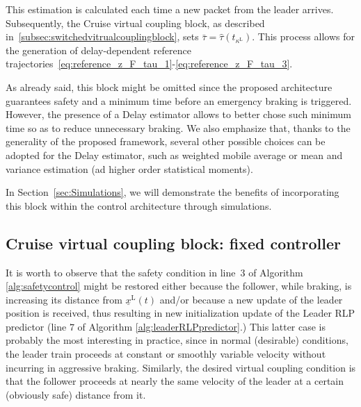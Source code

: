 \documentclass[letterpaper, 10 pt, conference]{ieeeconf}
\theoremstyle{definition}
\theoremstyle{nopoint}
\newcommand{\tildeAdd}{~}
\begin{document}
This estimation is calculated each time a new packet from the leader arrives. Subsequently, the Cruise virtual coupling block, as described in\tildeAdd\ref{subsec:switchedvitrualcouplingblock}, sets $\bar{\tau}=\hat{\tau}(t_{\kappa^\mathrm{L}})$. This process allows for the generation of delay-dependent reference trajectories\tildeAdd\eqref{eq:reference_z_F_tau_1}-\eqref{eq:reference_z_F_tau_3}.

As already said, this block might be omitted since the proposed architecture guarantees safety and a minimum time before an emergency braking is triggered. However, the presence of a Delay estimator allows to better chose such minimum time so as to reduce unnecessary braking. 
We also emphasize that, thanks to the generality of the proposed framework, several other possible choices can be adopted for the Delay estimator, such as weighted mobile average or mean and variance estimation (ad higher order statistical moments). 

In Section\tildeAdd\ref{sec:Simulations}, we will demonstrate the benefits of incorporating this block within the control architecture through simulations.



 
\subsection{Cruise virtual coupling block: fixed controller}
 \label{subsec:vitrualcouplingblock} 
 
It is worth to observe that the safety condition in line\tildeAdd$3$ of  Algorithm \ref{alg:safetycontrol} might be restored either because the follower, while braking, is increasing its distance from $\underline{x}^\mathrm{L}(t)$ and/or because a new update of the leader position is received, thus resulting in new initialization update of the Leader RLP predictor (line $7$ of Algorithm \ref{alg:leaderRLPpredictor}.)
This latter case is probably the most interesting in practice, since in normal (desirable) conditions, the leader train proceeds at constant or smoothly variable velocity without incurring in aggressive braking. Similarly, the desired virtual coupling condition is that the follower proceeds at nearly the same velocity of the leader at a certain (obviously safe) distance from it. 
\end{document}
